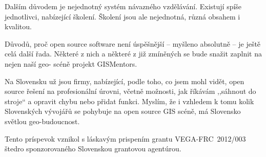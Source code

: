 \documentclass[twoside]{oss-conf}
\begin{document}
Dalším důvodem je nejednotný systém návazného vzdělávání. Existují spíše
jednotlivci, nabízející školení. Školení jsou ale nejednotná, různá obsahem i
kvalitou.

Důvodů, proč open source software není úspěšnější -- myšleno absolutně -- je ještě
celá další řada. Některé z nich a některé z již zmíněných se bude snažit zaplnit
na nejen naší geo- scéně projekt GISMentors.

Na Slovensku už jsou firmy, nabízející, podle toho, co jsem mohl vidět, open
source řešení na profesionální úrovni, včetně možnosti, jak říkávám ,,sáhnout do
stroje`` a opravit chybu nebo přidat funkci. Myslím, že i vzhledem k tomu kolik
Slovenských vývojářů se pohybuje na open source GIS scéně, má Slovensko světlou
geo-budoucnost.


\begin{acknowledgment}[Poďakovanie]
Tento príspevok vznikol s láskavým prispením grantu VEGA-FRC~2012/003 štedro sponzorovaného
Slovenskou grantovou agentúrou.
\end{acknowledgment}
\end{document}
